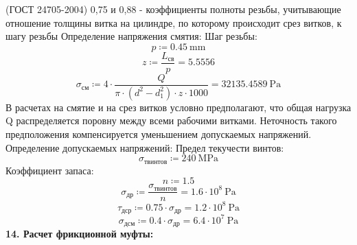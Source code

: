 \documentclass{article}
\newcommand{\defeq}{\coloneq} %
\begin{document}
\colorbox[HTML]{000000}{(ГОСТ 24705-2004)}\newline
\colorbox[HTML]{000000}{0,75 и 0,88 - коэффициенты полноты резьбы, учитывающие отношение толщины витка на цилиндре, по которому происходит срез витков, к шагу резьбы}\newline
\colorbox[HTML]{000000}{Определение напряжения смятия:}\newline
\colorbox[HTML]{000000}{Шаг резьбы:}\newline
\begin{equation*}
p \defeq 0.45 \: \mathrm{mm}
\end{equation*}
\begin{equation*}
z \defeq \frac{L_{св}}{p} = {5.5556}
\end{equation*}
\begin{equation*}
σ_{см} \defeq 4 \cdot \frac{Q}{{\pi} \cdot \left( d^{2}-\textit{d}_{\textit{1}}^{2} \right) \cdot z \cdot 1000} = {32135.4589 \: \mathrm{Pa}}
\end{equation*}
\colorbox[HTML]{000000}{В расчетах на смятие и на срез витков условно предполагают, что общая нагрузка Q распределяется поровну между всеми рабочими витками. Неточность такого предположения компенсируется уменьшением допускаемых напряжений.}\newline
\colorbox[HTML]{000000}{Определение допускаемых напряжений:}\newline
\colorbox[HTML]{000000}{Предел текучести винтов:}\newline
\begin{equation*}
σ_{твинтов} \defeq 240 \: \mathrm{MPa}
\end{equation*}
\colorbox[HTML]{000000}{Коэффициент запаса:}\newline
\begin{equation*}
n \defeq 1.5
\end{equation*}
\begin{equation*}
σ_{др} \defeq \frac{σ_{твинтов}}{n} = {1.6 \cdot 10^{8} \: \mathrm{Pa}}
\end{equation*}
\begin{equation*}
τ_{дср} \defeq 0.75 \cdot σ_{др} = {1.2 \cdot 10^{8} \: \mathrm{Pa}}
\end{equation*}
\begin{equation*}
σ_{дсм} \defeq 0.4 \cdot σ_{др} = {6.4 \cdot 10^{7} \: \mathrm{Pa}}
\end{equation*}
\colorbox[HTML]{000000}{\textbf{14. Расчет фрикционной муфты:}}\newline
\end{document}
